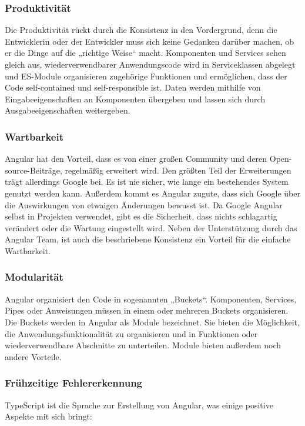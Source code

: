 \subsubsection{Produktivität}
Die Produktivität rückt durch die Konsistenz in den Vordergrund, denn die Entwicklerin oder der Entwickler muss sich keine Gedanken darüber machen, ob er die Dinge auf die „richtige Weise“ macht. Komponenten und Services sehen gleich aus, wiederverwendbarer Anwendungscode wird in Serviceklassen abgelegt und ES-Module organisieren zugehörige Funktionen und ermöglichen, dass der Code self-contained und self-responsible ist. Daten werden mithilfe von Eingabeeigenschaften an Komponenten übergeben und lassen sich durch Ausgabeeigenschaften weitergeben.

\subsubsection{Wartbarkeit}
Angular hat den Vorteil, dass es von einer großen Community und deren Open-source-Beiträge, regelmäßig erweitert wird. Den größten Teil der Erweiterungen trägt allerdings Google bei. Es ist nie sicher, wie lange ein bestehendes System genutzt werden kann. Außerdem kommt es Angular zugute, dass sich Google über die Auswirkungen von etwaigen Änderungen bewusst ist. Da Google Angular selbst in Projekten verwendet, gibt es die Sicherheit, dass nichts schlagartig verändert oder die Wartung eingestellt wird. Neben der Unterstützung durch das Angular Team, ist auch die beschriebene Konsistenz ein Vorteil für die einfache Wartbarkeit.

\subsubsection{Modularität}
Angular organisiert den Code in sogenannten „Buckets“. Komponenten, Services, Pipes oder Anweisungen müssen in einem oder mehreren Buckets organisieren. Die Buckets werden in Angular als Module bezeichnet. Sie bieten die Möglichkeit, die Anwendungsfunktionalität zu organisieren und in Funktionen oder wiederverwendbare Abschnitte zu unterteilen. Module bieten außerdem noch andere Vorteile. 

\subsubsection{Frühzeitige Fehlererkennung}
TypeScript ist die Sprache zur Erstellung von Angular, was einige positive Aspekte mit sich bringt:

